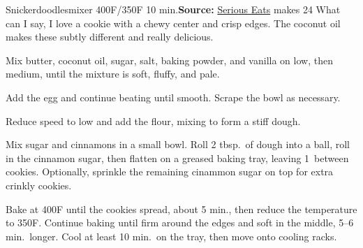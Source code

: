 \begin{recipe}{Snickerdoodles}{mixer \hfill 400\0F/350\0F \hfill 10 min.}{\textbf{Source:} \href{https://www.seriouseats.com/recipes/2016/01/new-fashioned-snickerdoodle-cookie-recipe.html}{Serious Eats} \hfill makes 24}
 \freeform What can I say, I love a cookie with a chewy center and crisp edges. The coconut oil makes these subtly different and really delicious.

 Mix butter, coconut oil, sugar, salt, baking powder, and vanilla on low, then medium, until the mixture is soft, fluffy, and pale.

 Add the egg and continue beating until smooth. Scrape the bowl as necessary.

 Reduce speed to low and add the flour, mixing to form a stiff dough.

 Mix sugar and cinnamons in a small bowl. Roll 2 tbsp.\ of dough into a ball, roll in the cinnamon sugar, then flatten on a greased baking tray, leaving 1\inch\ between cookies. Optionally, sprinkle the remaining cinammon sugar on top for extra crinkly cookies.

 \newstep Bake at 400\0F until the cookies spread, about 5 min., then reduce the temperature to 350\0F. Continue baking until firm around the edges and soft in the middle, 5--6 min.\ longer. Cool at least 10 min.\ on the tray, then move onto cooling racks.
\end{recipe}
